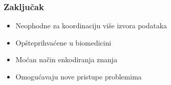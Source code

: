 \documentclass[xetex,mathserif,serif]{beamer}
\begin{document}
  \begin{frame}
    \frametitle{Zaključak}
		\begin{center}		
		\begin{itemize}
			\item Neophodne za koordinaciju više izvora podataka
			\item Opšteprihvaćene u biomedicini
			\item Moćan način enkodiranja znanja
			\item Omogućavaju nove pristupe problemima
		\end{itemize}
	\end{center}
  \end{frame} 
\end{document}
